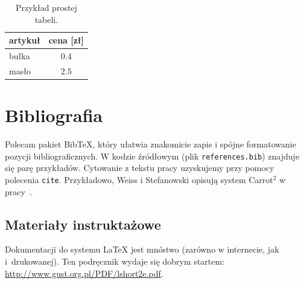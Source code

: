 \begin{table}
\caption{Przykład prostej tabeli.}\label{tab:przyklad}
\begin{center}
    \begin{tabular}{l | c}
    artykuł & cena [zł] \\
    \hline
    bułka   & $0.4$ \\
    masło   & $2.5$ \\
    \end{tabular}
\end{center}
\end{table}



\section{Bibliografia}

Polecam pakiet Bib\TeX, który ułatwia znakomicie zapis i spójne formatowanie
pozycji bibliograficznych. W kodzie źródłowym (plik \texttt{references.bib}) znajduje
się parę przykładów. Cytowanie z tekstu pracy uzyskujemy przy pomocy
polecenia \texttt{cite}. Przykładowo, Weiss i Stefanowski opisują system
Carrot$^2$ w pracy~\cite{stefanowski_weiss_awic2003}.



\subsection{Materiały instruktażowe}

Dokumentacji do systemu \LaTeX{} jest mnóstwo (zarówno w internecie, jak i~drukowanej).
Ten podręcznik wydaje się dobrym startem: \url{http://www.gust.org.pl/PDF/lshort2e.pdf}.


